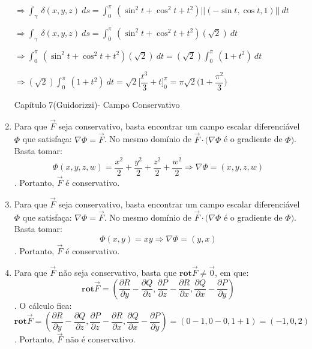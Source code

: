 \documentclass[11pt,a4paper]{article}
\begin{document}
\begin{enumerate}
            		$\Rightarrow \displaystyle\int_\gamma\ \delta(x,y,z)\ ds = \displaystyle\int_{0}^{\pi}\ (\sin^2 t  + \cos^2 t + t^2)||(-\sin t,\cos t,1)||\ dt $
            		
            		$\Rightarrow  \displaystyle\int_\gamma\ \delta(x,y,z)\ ds = \displaystyle\int_{0}^{\pi}\ (\sin^2 t  + \cos^2 t + t^2)(\sqrt{2})\ dt$
            		
            		$\Rightarrow \displaystyle\int_{0}^{\pi}\ (\sin^2 t  + \cos^2 t + t^2)(\sqrt{2})\ dt = (\sqrt{2})\displaystyle\int_{0}^{\pi}\ (1  + t^2)\ dt$
            		
            		$\Rightarrow (\sqrt{2})\displaystyle\int_{0}^{\pi}\ (1  + t^2)\ dt = \sqrt{2}\Bigg[\dfrac{t^3}{3} + t \Bigg]_0^{\pi} = \pi\sqrt{2}\Bigg(1 + \dfrac{\pi^2}{3}\Bigg)$ 

	\begin{center}
	    \begin{large}
	        Capítulo 7(Guidorizzi)- Campo Conservativo
	    \end{large}
	\end{center}

\item Para que $ \vec{F} $ seja conservativo, basta encontrar um campo escalar diferenci\'{a}vel $ \Phi $ que satisfa\c{c}a: $ \nabla \Phi = \vec{F} $. No mesmo dom\'{i}nio de $ \vec{F} \cdot (\nabla \Phi $ \'{e} o gradiente de $ \Phi ) $. Basta tomar: $$ \Phi (x,y,z,w) = \frac{x^2}{2} + \frac{y^2}{2} + \frac{z^2}{2} + \frac{w^2}{2} \Rightarrow \nabla \Phi = (x,y,z,w) $$. Portanto, $ \vec{F} $ \'{e} conservativo.


\item Para que $ \vec{F} $ seja conservativo, basta encontrar um campo escalar diferenci\'{a}vel $ \Phi $ que satisfa\c{c}a: $ \nabla \Phi = \vec{F} $. No mesmo dom\'{i}nio de $ \vec{F} \cdot (\nabla \Phi $ \'{e} o gradiente de $ \Phi ) $. Basta tomar: $$ \Phi (x,y) = xy \Rightarrow \nabla \Phi = (y,x) $$. Portanto, $ \vec{F} $ \'{e} conservativo.


\item Para que $ \vec{F} $ n\~{a}o seja conservativo, basta que $ \textbf{rot} \vec{F} \ne \vec{0} $, em que: $$ \textbf{rot} \vec{F} = \left(\frac{\partial R}{\partial y} - \frac{\partial Q}{\partial z}, \frac{\partial P}{\partial z} - \frac{\partial R}{\partial x}, \frac{\partial Q}{\partial x} - \frac{\partial P}{\partial y}\right) $$. O c\'{a}lculo fica: $$ \textbf{rot} \vec{F} = \left(\frac{\partial R}{\partial y} - \frac{\partial Q}{\partial z}, \frac{\partial P}{\partial z} - \frac{\partial R}{\partial x}, \frac{\partial Q}{\partial x} - \frac{\partial P}{\partial y}\right) = (0-1, 0-0, 1+1) = (-1,0,2) $$. Portanto, $ \vec{F} $ n\~{a}o \'{e} conservativo.



\end{enumerate}
\end{document}
